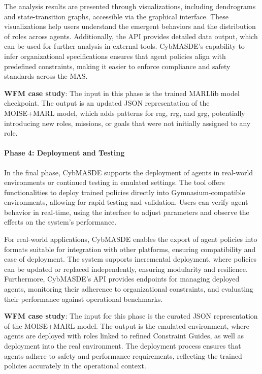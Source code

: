 \documentclass[sigconf,anonymous]{aamas}
\begin{document}
The analysis results are presented through visualizations, including dendrograms and state-transition graphs, accessible via the graphical interface. These visualizations help users understand the emergent behaviors and the distribution of roles across agents. Additionally, the API provides detailed data output, which can be used for further analysis in external tools. CybMASDE's capability to infer organizational specifications ensures that agent policies align with predefined constraints, making it easier to enforce compliance and safety standards across the MAS.

\textbf{WFM case study}: The input in this phase is the trained MARLlib model checkpoint. The output is an updated JSON representation of the MOISE+MARL model, which adds patterns for rag, rrg, and grg, potentially introducing new roles, missions, or goals that were not initially assigned to any role.

\paragraph{Phase 4: Deployment and Testing}

In the final phase, CybMASDE supports the deployment of agents in real-world environments or continued testing in emulated settings. The tool offers functionalities to deploy trained policies directly into Gymnasium-compatible environments, allowing for rapid testing and validation. Users can verify agent behavior in real-time, using the interface to adjust parameters and observe the effects on the system's performance.

For real-world applications, CybMASDE enables the export of agent policies into formats suitable for integration with other platforms, ensuring compatibility and ease of deployment. The system supports incremental deployment, where policies can be updated or replaced independently, ensuring modularity and resilience. Furthermore, CybMASDE's API provides endpoints for managing deployed agents, monitoring their adherence to organizational constraints, and evaluating their performance against operational benchmarks.

\textbf{WFM case study}: The input for this phase is the curated JSON representation of the MOISE+MARL model. The output is the emulated environment, where agents are deployed with roles linked to refined Constraint Guides, as well as deployment into the real environment. The deployment process ensures that agents adhere to safety and performance requirements, reflecting the trained policies accurately in the operational context.
\end{document}
